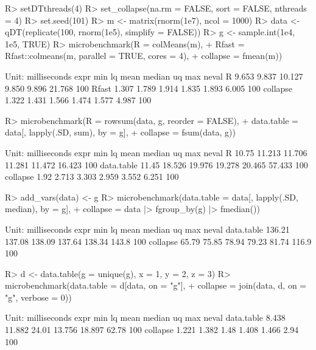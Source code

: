 \documentclass[article]{jss}
\begin{document}
%
\begin{Schunk}
\begin{Sinput}
R> setDTthreads(4)
R> set_collapse(na.rm = FALSE, sort = FALSE, nthreads = 4)
R> set.seed(101)
R> m <- matrix(rnorm(1e7), ncol = 1000)
R> data <- qDT(replicate(100, rnorm(1e5), simplify = FALSE))
R> g <- sample.int(1e4, 1e5, TRUE)
R> microbenchmark(R = colMeans(m),
+                 Rfast = Rfast::colmeans(m, parallel = TRUE, cores = 4),
+                 collapse = fmean(m))
\end{Sinput}
\begin{Soutput}
Unit: milliseconds
     expr   min    lq   mean median    uq    max neval
        R 9.653 9.837 10.127  9.850 9.896 21.768   100
    Rfast 1.307 1.789  1.914  1.835 1.893  6.005   100
 collapse 1.322 1.431  1.566  1.474 1.577  4.987   100
\end{Soutput}
\begin{Sinput}
R> microbenchmark(R = rowsum(data, g, reorder = FALSE),
+                 data.table = data[, lapply(.SD, sum), by = g],
+                 collapse = fsum(data, g))
\end{Sinput}
\begin{Soutput}
Unit: milliseconds
       expr   min     lq   mean median     uq    max neval
          R 10.75 11.213 11.706 11.281 11.472 16.423   100
 data.table 11.45 18.526 19.976 19.278 20.465 57.433   100
   collapse  1.92  2.713  3.303  2.959  3.552  6.251   100
\end{Soutput}
\begin{Sinput}
R> add_vars(data) <- g
R> microbenchmark(data.table = data[, lapply(.SD, median), by = g],
+                 collapse = data |> fgroup_by(g) |> fmedian())
\end{Sinput}
\begin{Soutput}
Unit: milliseconds
       expr    min     lq   mean median     uq   max neval
 data.table 136.21 137.08 138.09 137.64 138.34 143.8   100
   collapse  65.79  75.85  78.94  79.23  81.74 116.9   100
\end{Soutput}
\begin{Sinput}
R> d <- data.table(g = unique(g), x = 1, y = 2, z = 3)
R> microbenchmark(data.table = d[data, on = "g"],
+                 collapse = join(data, d, on = "g", verbose = 0))
\end{Sinput}
\begin{Soutput}
Unit: milliseconds
       expr   min     lq  mean median     uq   max neval
 data.table 8.438 11.882 24.01 13.756 18.897 62.78   100
   collapse 1.221  1.382  1.48  1.408  1.466  2.94   100

\end{Soutput}
\end{Schunk}
\end{document}
